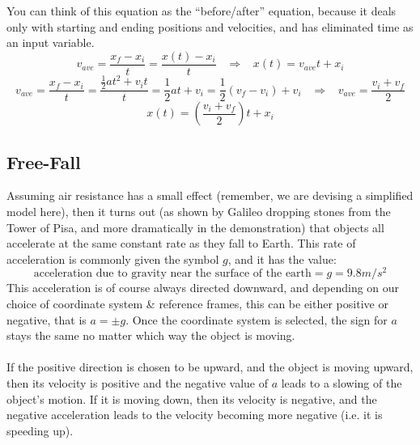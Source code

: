 \documentclass[12pt,addpoints]{exam}
\begin{document}
	You can think of this equation as the “before/after” equation, because it deals only with starting and ending positions and velocities, and has eliminated time as an input variable.
	$${v_{ave}} = \dfrac{x_f - x_i}{t} = \dfrac{x \left( t \right) - x_i}{t}\;\;\;\Rightarrow \;\;\; x \left( t \right) = v_{ave}t + x_i$$
	$${v_{ave}} = \dfrac{x_f - x_i}{t} = \dfrac{\frac{1}{2}a{t^2} + {v_i}t}{t} = \frac{1}{2}at + v_i = \frac{1}{2}\left( v_f - v_i \right) + v_i \;\;\; \Rightarrow \;\;\; v_{ave} = \dfrac{v_i + v_f}{2}$$
	$$x \left( t \right) = (\dfrac{v_i + v_f}{2})t + x_i$$
	\begin{center}
		\subsection*{Free-Fall}
	\end{center}
	Assuming air resistance has a small effect (remember, we are devising a simplified model here), then it turns out (as shown by Galileo dropping stones from the Tower of Pisa, and more dramatically in the demonstration) that objects all accelerate at the same constant rate as they fall to Earth. This rate of acceleration is commonly given the symbol $g$, and it has the value:
	$$\text{acceleration due to gravity near the surface of the earth}=g=9.8m/s^2$$
	This acceleration is of course always directed downward, and depending on our choice of coordinate system \& reference frames, this can be either positive or negative, that is $a=\pm g$. Once the coordinate system is selected, the sign for $a$ stays the same no matter which way the object is moving. \\ \\
	If the positive direction is chosen to be upward, and the object is moving upward, then its velocity is positive and the negative value of $a$
	leads to a slowing of the object’s motion. If it is moving down, then its velocity is negative, and the negative acceleration leads to the velocity becoming more negative (i.e. it is speeding up).
	
\end{document}
